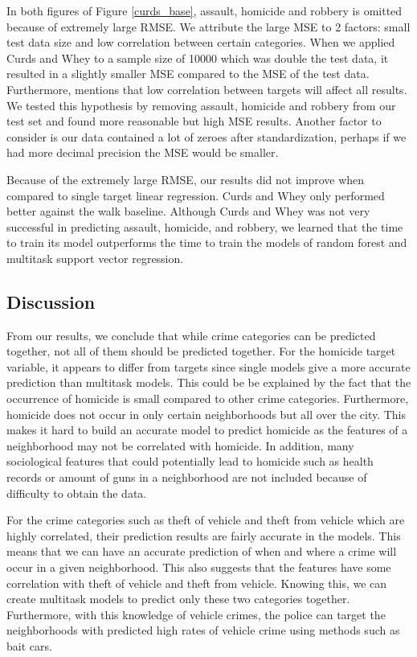 \documentclass{article}
\begin{document}
In both figures of Figure \ref{curds_base}, assault, homicide and robbery is omitted because of extremely large RMSE. We attribute the large MSE to 2 factors: small test data size and low correlation between certain categories. When we applied Curds and Whey to a sample size of 10000 which was double the test data, it resulted in a slightly smaller MSE compared to the MSE of the test data. Furthermore, \citet{kidd_implementation_2014} mentions that low correlation between targets will affect all results. We tested this hypothesis by removing assault, homicide and robbery from our test set and found more reasonable but high MSE results. Another factor to consider is our data contained a lot of zeroes after standardization, perhaps if we had more decimal precision the MSE would be smaller.

Because of the extremely large RMSE, our results did not improve when compared to single target linear regression. Curds and Whey only performed better against the walk baseline. Although Curds and Whey was not very successful in predicting assault, homicide, and robbery, we learned that the time to train its model outperforms the time to train the models of random forest and multitask support vector regression.

\subsection{Discussion}

From our results, we conclude that while crime categories can be predicted together, not all of them should be predicted together. For the homicide target variable, it appears to differ from targets since single models give a more accurate prediction than multitask models. This could be be explained by the fact that the occurrence of homicide is small compared to other crime categories. Furthermore, homicide does not occur in only certain neighborhoods but all over the city. This makes it hard to build an accurate model to predict homicide as the features of a neighborhood may not be correlated with homicide. In addition, many sociological features that could potentially lead to homicide such as health records or amount of guns in a neighborhood are not included because of difficulty to obtain the data.

For the crime categories such as theft of vehicle and theft from vehicle which are highly correlated, their prediction results are fairly accurate in the models. This means that we can have an accurate prediction of when and where a crime will occur in a given neighborhood. This also suggests that the features have some correlation with theft of vehicle and theft from vehicle. Knowing this, we can create multitask models to predict only these two categories together. Furthermore, with this knowledge of vehicle crimes, the police can target the neighborhoods with predicted high rates of vehicle crime using methods such as bait cars.
\end{document}
